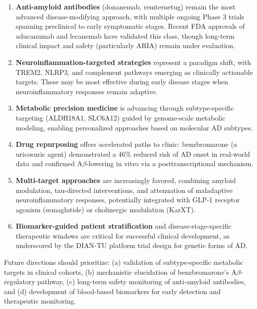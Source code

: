 \documentclass[11pt, a4paper]{article}
\begin{document}
\begin{enumerate}
    \item \textbf{Anti-amyloid antibodies} (donanemab, remternetug) remain the most advanced disease-modifying approach, with multiple ongoing Phase 3 trials spanning preclinical to early symptomatic stages. Recent FDA approvals of aducanumab and lecanemab have validated this class, though long-term clinical impact and safety (particularly ARIA) remain under evaluation.

    \item \textbf{Neuroinflammation-targeted strategies} represent a paradigm shift, with TREM2, NLRP3, and complement pathways emerging as clinically actionable targets. These may be most effective during early disease stages when neuroinflammatory responses remain adaptive.

    \item \textbf{Metabolic precision medicine} is advancing through subtype-specific targeting (ALDH18A1, SLC6A12) guided by genome-scale metabolic modeling, enabling personalized approaches based on molecular AD subtypes.

    \item \textbf{Drug repurposing} offers accelerated paths to clinic: benzbromarone (a uricosuric agent) demonstrated a 46\% reduced risk of AD onset in real-world data and confirmed A$\beta$-lowering in vitro via a posttranscriptional mechanism.

    \item \textbf{Multi-target approaches} are increasingly favored, combining amyloid modulation, tau-directed interventions, and attenuation of maladaptive neuroinflammatory responses, potentially integrated with GLP-1 receptor agonism (semaglutide) or cholinergic modulation (KarXT).

    \item \textbf{Biomarker-guided patient stratification} and disease-stage-specific therapeutic windows are critical for successful clinical development, as underscored by the DIAN-TU platform trial design for genetic forms of AD.
\end{enumerate}

Future directions should prioritize: (a) validation of subtype-specific metabolic targets in clinical cohorts, (b) mechanistic elucidation of benzbromarone's A$\beta$-regulatory pathway, (c) long-term safety monitoring of anti-amyloid antibodies, and (d) development of blood-based biomarkers for early detection and therapeutic monitoring.
\end{document}
